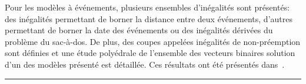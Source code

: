 \begin{center}
\begin{minipage}{\textwidth}
{      Pour les modèles à événements, plusieurs ensembles d'inégalités
      sont présentés: des inégalités permettant de borner la distance
      entre deux événements, d'autres permettant de borner la date des
      événements ou des inégalités dérivées du problème du
      sac-à-dos. De plus, des coupes appelées inégalités de
      non-préemption sont définies et une étude polyédrale de
      l'ensemble des vecteurs binaires solution d'un des modèles
      présenté est détaillée. Ces résultats ont été présentés 
      dans~\cite{Nattaf_ROADEF16,Nattaf_ECCO16}. }
    \vspace{0.5cm}
    \hrule
  \end{minipage}
\end{center}

 

